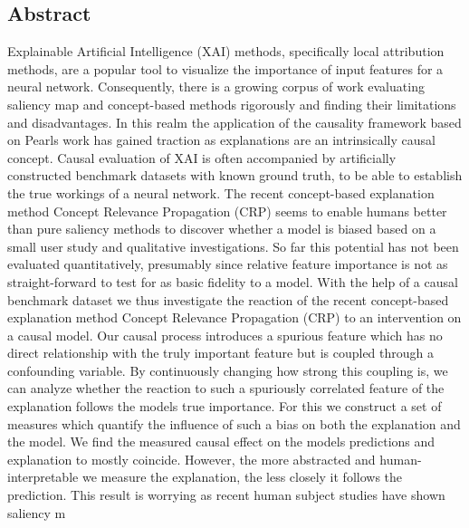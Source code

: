 \pagestyle{empty}
\subsection*{Abstract}


Explainable Artificial Intelligence (XAI) methods, specifically local attribution methods, are a popular tool to visualize the importance of input features for a neural network.
Consequently, there is a growing corpus of work evaluating saliency map and concept-based methods rigorously and finding their limitations and disadvantages. In this realm the application of the causality framework based on Pearls work has gained traction as explanations are an intrinsically causal concept. Causal evaluation of XAI is often accompanied by artificially constructed benchmark datasets with known ground truth, to be able to establish the true workings of a neural network. 
The recent concept-based explanation method Concept Relevance Propagation (CRP) seems to enable humans better than pure saliency methods to discover whether a model is biased based on a small user study and qualitative investigations. So far this potential has not been evaluated quantitatively, presumably since relative feature importance is not as straight-forward to test for as basic fidelity to a model. 
With the help of a causal benchmark dataset we thus investigate the reaction of the recent concept-based explanation method Concept Relevance Propagation (CRP) to an intervention on a causal model. Our causal process introduces a spurious feature which has no direct relationship with the truly important feature but is coupled through a confounding variable. By continuously changing how strong this coupling is, we can analyze whether the reaction to such a spuriously correlated feature of the explanation follows the models true importance. For this we construct a set of measures which quantify the influence of such a bias on both the explanation and the model. We find the measured causal effect on the models predictions and explanation to mostly coincide. However, the more abstracted and human-interpretable we measure the explanation, the less closely it follows the prediction. This result is worrying as recent human subject studies have shown saliency m
